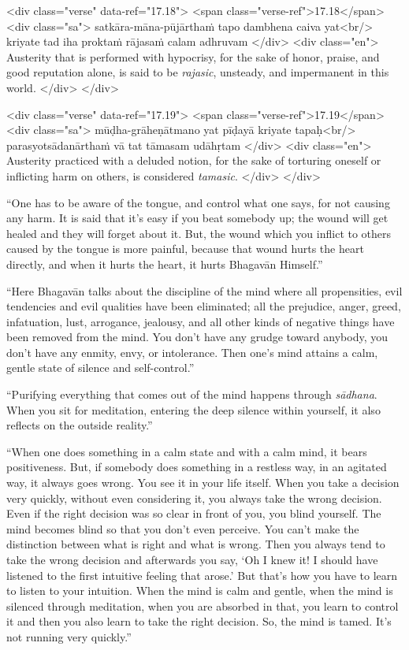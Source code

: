 \begin{html}
<div class="verse" data-ref="17.18">
  <span class="verse-ref">17.18</span>
  <div class="sa">
    satkāra-māna-pūjārthaṁ tapo dambhena caiva yat<br/>
    kriyate tad iha proktaṁ rājasaṁ calam adhruvam
  </div>
  <div class="en">
    Austerity that is performed with hypocrisy, for the sake of honor, praise, and good reputation alone, is said to be \textit{rajasic}, unsteady, and impermanent in this world.
  </div>
</div>
\end{html}



\begin{html}
<div class="verse" data-ref="17.19">
  <span class="verse-ref">17.19</span>
  <div class="sa">
    mūḍha-grāheṇātmano yat pīḍayā kriyate tapaḥ<br/>
    parasyotsādanārthaṁ vā tat tāmasam udāhṛtam
  </div>
  <div class="en">
    Austerity practiced with a deluded notion, for the sake of torturing oneself or inflicting harm on others, is considered \textit{tamasic}.
  </div>
</div>
\end{html}


\enquote{One has to be aware of the tongue, and control what one says, for not causing any harm. It is said that it’s easy if you beat somebody up; the wound will get healed and they will forget about it. But, the wound which you inflict to others caused by the tongue is more painful, because that wound hurts the heart directly, and when it hurts the heart, it hurts Bhagavān Himself.}

\enquote{Here Bhagavān talks about the discipline of the mind where all propensities, evil tendencies and evil qualities have been eliminated; all the prejudice, anger, greed, infatuation, lust, arrogance, jealousy, and all other kinds of negative things have been removed from the mind. You don’t have any grudge toward anybody, you don’t have any enmity, envy, or intolerance. Then one’s mind attains a calm, gentle state of silence and self-control.}

\enquote{Purifying everything that comes out of the mind happens through \textit{sādhana}. When you sit for meditation, entering the deep silence within yourself, it also reflects on the outside reality.}

\enquote{When one does something in a calm state and with a calm mind, it bears positiveness. But, if somebody does something in a restless way, in an agitated way, it always goes wrong. You see it in your life itself. When you take a decision very quickly, without even considering it, you always take the wrong decision. Even if the right decision was so clear in front of you, you blind yourself. The mind becomes blind so that you don’t even perceive. You can’t make the distinction between what is right and what is wrong. Then you always tend to take the wrong decision and afterwards you say, \enquote{Oh I knew it! I should have listened to the first intuitive feeling that arose.} But that’s how you have to learn to listen to your intuition. When the mind is calm and gentle, when the mind is silenced through meditation, when you are absorbed in that, you learn to control it and then you also learn to take the right decision. So, the mind is tamed. It’s not running very quickly.}

